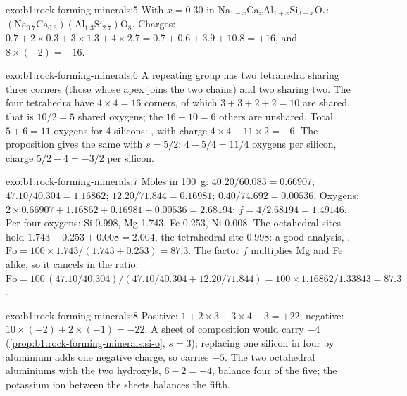\begin{solution}{exo:b1:rock-forming-minerals:5}
With $x = 0.30$ in $\mathrm{Na}_{1-x}\mathrm{Ca}_x\mathrm{Al}_{1+x}\mathrm{Si}_{3-x}\mathrm{O}_8$:
$\mathrm{(Na_{0.7}Ca_{0.3})(Al_{1.3}Si_{2.7})O_8}$. Charges:
$0.7 + 2\times0.3 + 3\times1.3 + 4\times2.7 = 0.7 + 0.6 + 3.9 + 10.8 = +16$,
and $8\times(-2) = -16$.
\end{solution}

\begin{solution}{exo:b1:rock-forming-minerals:6}
A repeating group has two tetrahedra sharing three corners (those whose apex
joins the two chains) and two sharing two. The four tetrahedra have
$4\times4 = 16$ corners, of which $3 + 3 + 2 + 2 = 10$ are shared, that is
$10/2 = 5$ shared oxygens; the $16 - 10 = 6$ others are unshared. Total
$5 + 6 = 11$ oxygens for 4 silicons: , with charge
$4\times4 - 11\times2 = -6$. The proposition gives the same with
$s = 5/2$: $4 - 5/4 = 11/4$ oxygens per silicon, charge $5/2 - 4 = -3/2$ per
silicon.
\end{solution}

\begin{solution}{exo:b1:rock-forming-minerals:7}
Moles in \qty{100}{g}:  $40.20/60.083 = 0.66907$; 
$47.10/40.304 = 1.16862$;  $12.20/71.844 = 0.16981$; 
$0.40/74.692 = 0.00536$. Oxygens: $2\times0.66907 + 1.16862 + 0.16981 +
0.00536 = 2.68194$; $f = 4/2.68194 = 1.49146$. Per four oxygens: Si
\num{0.998}, Mg \num{1.743}, Fe \num{0.253}, Ni \num{0.008}. The
octahedral sites hold $1.743 + 0.253 + 0.008 = 2.004$, the tetrahedral site
\num{0.998}: a good analysis, .
$\mathrm{Fo} = 100\times1.743/(1.743 + 0.253) = 87.3$. The factor $f$
multiplies Mg and Fe alike, so it cancels in the ratio:
$\mathrm{Fo} = 100\,(47.10/40.304)/(47.10/40.304 + 12.20/71.844) =
100\times1.16862/1.33843 = 87.3$.
\end{solution}

\begin{solution}{exo:b1:rock-forming-minerals:8}
Positive: $1 + 2\times3 + 3\times4 + 3 = +22$; negative:
$10\times(-2) + 2\times(-1) = -22$. A sheet of composition  would
carry $-4$ (\cref{prop:b1:rock-forming-minerals:si-o}, $s = 3$); replacing one
silicon in four by aluminium adds one negative charge, so 
carries $-5$. The two octahedral aluminiums with the two hydroxyls,
$6 - 2 = +4$, balance four of the five; the potassium ion between the sheets
balances the fifth.
\end{solution}

